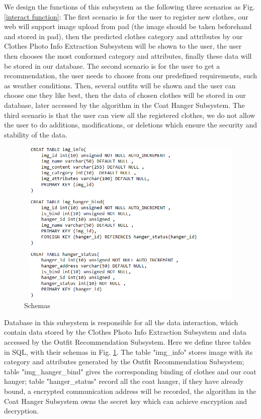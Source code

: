We design the functions of this subsystem as the following three scenarios as Fig. \ref{interact function}: The first scenario is for the user to register new clothes, our web will support image upload from pad (the image should be taken beforehand and stored in pad), then the predicted clothes category and attributes by our Clothes Photo Info Extraction Subsystem will be shown to the user, the user then chooses the most conformed category and attributes, finally these data will be stored in our database. The second scenario is for the user to get a recommendation, the user needs to choose from our predefined requirements, such as weather conditions. Then, several outfits will be shown and the user can choose one they like best, then the data of chosen clothes will be stored in our database, later accessed by the algorithm in the Coat Hanger Subsystem. The third scenario is that the user can view all the registered clothes, we do not allow the user to do additions, modifications, or deletions which ensure the security and stability of the data. 
\begin{figure}[h]
   \centering
   \includegraphics[width=12cm,height=8cm]{graph/db_schema.png}
   \caption{Schemas}
   \label{db_schema}
   \end{figure}


Database in this subsystem is responsible for all the data interaction, which contain data stored by the Clothes Photo Info Extraction Subsystem and data accessed by the Outfit Recommendation Subsystem. Here we define three tables in SQL, with their schemas in Fig. \ref{db_schema}. The table "img\_info" stores image with its category and attributes generated by the Outfit Recommendation Subsystem; table "img\_hanger\_bind" gives the corresponding binding of clothes and our coat hanger; table "hanger\_status" record all the coat hanger, if they have already bound, a encrypted communication address will be recorded, the algorithm in the Coat Hanger Subsystem owns the secret key which can achieve encryption and decryption.
 
